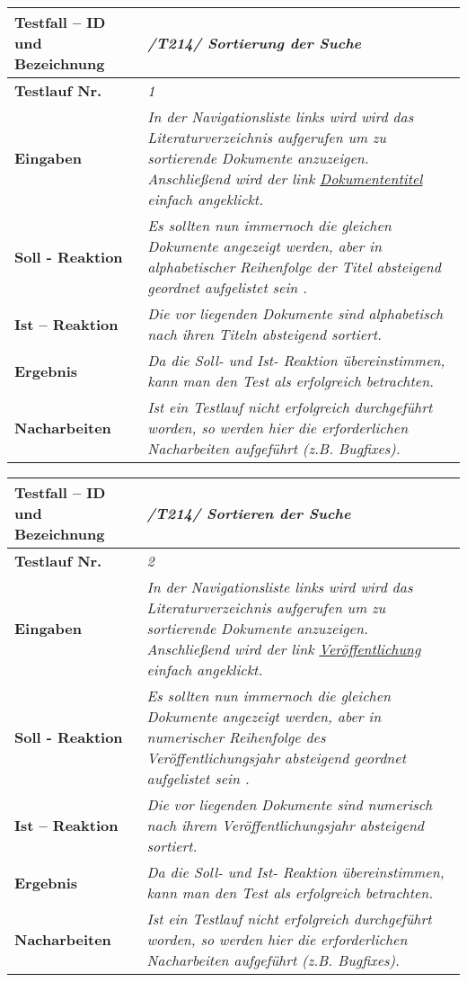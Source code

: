 \begin{longtable}{|p{5cm}|p{10cm}|}
\hline
\textbf{Testfall -- ID und Bezeichnung} & \textit{/T214/ Sortierung der Suche} \\
\hline
\textbf{Testlauf Nr.} & \textit{1} \\
\hline
\textbf{Eingaben} & \textit{In der Navigationsliste links wird wird das Literaturverzeichnis aufgerufen um zu sortierende Dokumente anzuzeigen. Anschließend wird der link \uline{Dokumententitel} einfach angeklickt.} \\
\hline
\textbf{Soll - Reaktion} & \textit{Es sollten nun immernoch die gleichen Dokumente angezeigt werden, aber in alphabetischer Reihenfolge der Titel absteigend geordnet aufgelistet sein .} \\
\hline
\textbf{Ist -- Reaktion} & \textit{Die vor liegenden Dokumente sind alphabetisch nach ihren Titeln absteigend sortiert.} \\
\hline
\textbf{Ergebnis} & \textit{Da die Soll- und Ist- Reaktion übereinstimmen, kann man den Test als erfolgreich betrachten.} \\
\hline
\textbf{Nacharbeiten } & \textit{Ist ein Testlauf nicht erfolgreich
durchgef\"uhrt worden, so werden hier die erforderlichen Nacharbeiten aufgef\"uhrt
(z.B. Bugfixes).} \\
\hline
 \end{longtable}
 
\begin{longtable}{|p{5cm}|p{10cm}|}
\hline
\textbf{Testfall -- ID und Bezeichnung} & \textit{/T214/ Sortieren der Suche} \\
\hline
\textbf{Testlauf Nr.} & \textit{2} \\
\hline
\textbf{Eingaben} & \textit{In der Navigationsliste links wird wird das Literaturverzeichnis aufgerufen um zu sortierende Dokumente anzuzeigen. Anschließend wird der link \uline{Veröffentlichung} einfach angeklickt.} \\
\hline
\textbf{Soll - Reaktion} & \textit{Es sollten nun immernoch die gleichen Dokumente angezeigt werden, aber in numerischer Reihenfolge des Veröffentlichungsjahr absteigend geordnet aufgelistet sein .} \\
\hline
\textbf{Ist -- Reaktion} & \textit{Die vor liegenden Dokumente sind numerisch nach ihrem Veröffentlichungsjahr absteigend sortiert.} \\
\hline
\textbf{Ergebnis} & \textit{Da die Soll- und Ist- Reaktion übereinstimmen, kann man den Test als erfolgreich betrachten.} \\
\hline
\textbf{Nacharbeiten } & \textit{Ist ein Testlauf nicht erfolgreich
durchgef\"uhrt worden, so werden hier die erforderlichen Nacharbeiten aufgef\"uhrt
(z.B. Bugfixes).} \\
\hline
 \end{longtable}
 
